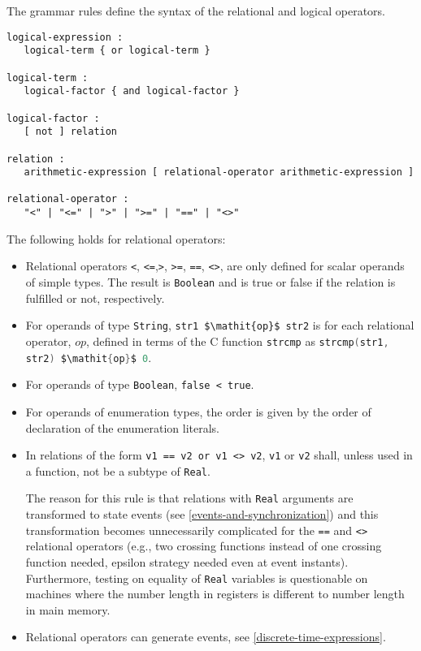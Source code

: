 The grammar rules define the syntax of the relational and logical operators.
\begin{lstlisting}[language=grammar]
logical-expression :
   logical-term { or logical-term }

logical-term :
   logical-factor { and logical-factor }

logical-factor :
   [ not ] relation

relation :
   arithmetic-expression [ relational-operator arithmetic-expression ]

relational-operator :
   "<" | "<=" | ">" | ">=" | "==" | "<>"
\end{lstlisting}

The following holds for relational operators:
\begin{itemize}
\item
  Relational operators \lstinline!<!, \lstinline!<=!,\lstinline!>!, \lstinline!>=!, \lstinline!==!, \lstinline!<>!, are only defined for scalar operands of simple types.
  The result is \lstinline!Boolean! and is true or false if the relation is fulfilled or not, respectively.
\item
  For operands of type \lstinline!String!, \lstinline!str1 $\mathit{op}$ str2! is for each relational operator, $\mathit{op}$, defined in terms of the C function \lstinline[language=C]!strcmp! as \lstinline[language=C]!strcmp(str1, str2) $\mathit{op}$ 0!.
\item
  For operands of type \lstinline!Boolean!, \lstinline!false < true!.
\item
  For operands of enumeration types, the order is given by the order of declaration of the enumeration literals.
\item
  In relations of the form \lstinline!v1 == v2 or v1 <> v2!, \lstinline!v1! or \lstinline!v2! shall, unless used in a function, not be a subtype of \lstinline!Real!.
  \begin{nonnormative}
  The reason for this rule is that relations with \lstinline!Real! arguments are transformed to state events (see \cref{events-and-synchronization}) and this transformation becomes unnecessarily complicated for the \lstinline!==! and \lstinline!<>! relational operators (e.g., two crossing functions instead of one crossing function needed, epsilon strategy needed even at event instants).
  Furthermore, testing on equality of \lstinline!Real! variables is questionable on machines where the number length in registers is different to number length in main memory.
  \end{nonnormative}
\item
  Relational operators can generate events, see \cref{discrete-time-expressions}.
\end{itemize}

